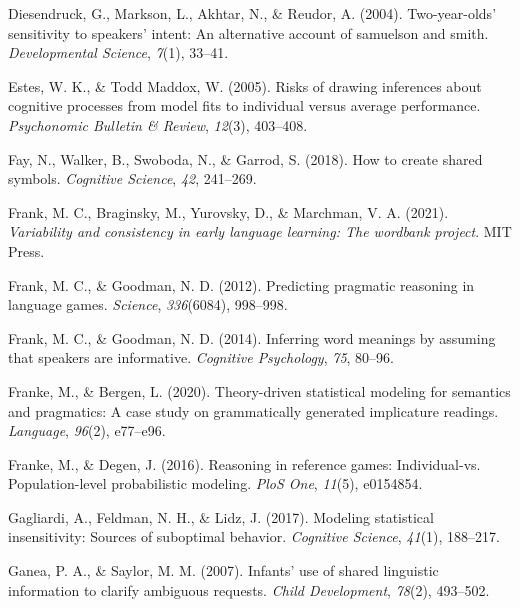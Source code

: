 \documentclass[
  man,floatsintext]{apa6}
\newlength{\cslhangindent}
\newlength{\cslentryspacingunit} %
\newenvironment{CSLReferences}[2] %
 {%
  \setlength{\parindent}{0pt}
  \ifodd #1
  \let\oldpar\par
  \def\par{\hangindent=\cslhangindent\oldpar}
  \fi
  \setlength{\parskip}{#2\cslentryspacingunit}
 }%
 {}
\begin{document}
\begin{CSLReferences}{1}{0}
\leavevmode{}%
Diesendruck, G., Markson, L., Akhtar, N., \& Reudor, A. (2004). Two-year-olds' sensitivity to speakers' intent: An alternative account of samuelson and smith. \emph{Developmental Science}, \emph{7}(1), 33--41.

\leavevmode{}%
Estes, W. K., \& Todd Maddox, W. (2005). Risks of drawing inferences about cognitive processes from model fits to individual versus average performance. \emph{Psychonomic Bulletin \& Review}, \emph{12}(3), 403--408.

\leavevmode{}%
Fay, N., Walker, B., Swoboda, N., \& Garrod, S. (2018). How to create shared symbols. \emph{Cognitive Science}, \emph{42}, 241--269.

\leavevmode{}%
Frank, M. C., Braginsky, M., Yurovsky, D., \& Marchman, V. A. (2021). \emph{Variability and consistency in early language learning: The wordbank project}. MIT Press.

\leavevmode{}%
Frank, M. C., \& Goodman, N. D. (2012). Predicting pragmatic reasoning in language games. \emph{Science}, \emph{336}(6084), 998--998.

\leavevmode{}%
Frank, M. C., \& Goodman, N. D. (2014). Inferring word meanings by assuming that speakers are informative. \emph{Cognitive Psychology}, \emph{75}, 80--96.

\leavevmode{}%
Franke, M., \& Bergen, L. (2020). Theory-driven statistical modeling for semantics and pragmatics: A case study on grammatically generated implicature readings. \emph{Language}, \emph{96}(2), e77--e96.

\leavevmode{}%
Franke, M., \& Degen, J. (2016). Reasoning in reference games: Individual-vs. Population-level probabilistic modeling. \emph{PloS One}, \emph{11}(5), e0154854.

\leavevmode{}%
Gagliardi, A., Feldman, N. H., \& Lidz, J. (2017). Modeling statistical insensitivity: Sources of suboptimal behavior. \emph{Cognitive Science}, \emph{41}(1), 188--217.

\leavevmode{}%
Ganea, P. A., \& Saylor, M. M. (2007). Infants' use of shared linguistic information to clarify ambiguous requests. \emph{Child Development}, \emph{78}(2), 493--502.


\end{CSLReferences}
\end{document}
